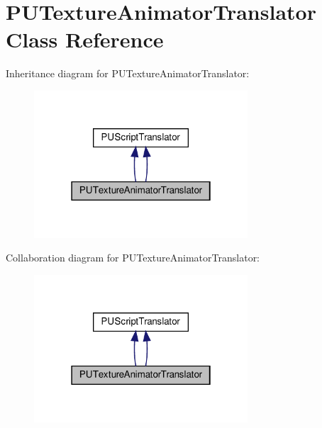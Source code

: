 \hypertarget{classPUTextureAnimatorTranslator}{}\section{P\+U\+Texture\+Animator\+Translator Class Reference}
\label{classPUTextureAnimatorTranslator}


Inheritance diagram for P\+U\+Texture\+Animator\+Translator\+:
\nopagebreak
\begin{figure}[H]
\begin{center}
\leavevmode
\includegraphics[width=226pt]{classPUTextureAnimatorTranslator__inherit__graph}
\end{center}
\end{figure}


Collaboration diagram for P\+U\+Texture\+Animator\+Translator\+:
\nopagebreak
\begin{figure}[H]
\begin{center}
\leavevmode
\includegraphics[width=226pt]{classPUTextureAnimatorTranslator__coll__graph}
\end{center}
\end{figure}
